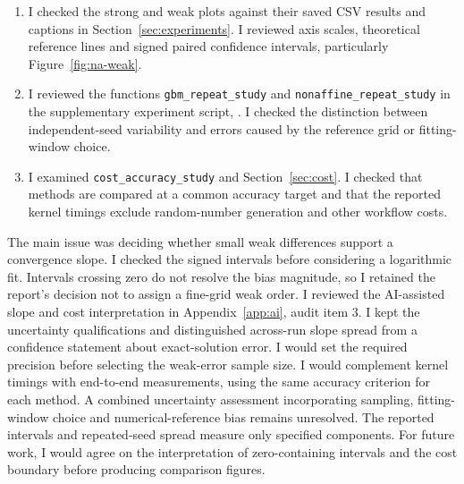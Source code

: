 \begin{enumerate}[leftmargin=2em,itemsep=2pt,topsep=2pt]
\item I checked the strong and weak plots against their saved CSV results and captions in Section~\ref{sec:experiments}. I reviewed axis scales, theoretical reference lines and signed paired confidence intervals, particularly Figure~\ref{fig:na-weak}.
\item I reviewed the functions \texttt{gbm\_repeat\_study} and \texttt{nonaffine\_repeat\_study} in the supplementary experiment script, . I checked the distinction between independent-seed variability and errors caused by the reference grid or fitting-window choice.
\item I examined \texttt{cost\_accuracy\_study} and Section~\ref{sec:cost}. I checked that methods are compared at a common accuracy target and that the reported kernel timings exclude random-number generation and other workflow costs.
\end{enumerate}
The main issue was deciding whether small weak differences support a convergence slope. I checked the signed intervals before considering a logarithmic fit. Intervals crossing zero do not resolve the bias magnitude, so I retained the report's decision not to assign a fine-grid weak order.
I reviewed the AI-assisted slope and cost interpretation in Appendix~\ref{app:ai}, audit item 3. I kept the uncertainty qualifications and distinguished across-run slope spread from a confidence statement about exact-solution error.
I would set the required precision before selecting the weak-error sample size. I would complement kernel timings with end-to-end measurements, using the same accuracy criterion for each method.
A combined uncertainty assessment incorporating sampling, fitting-window choice and numerical-reference bias remains unresolved. The reported intervals and repeated-seed spread measure only specified components.
For future work, I would agree on the interpretation of zero-containing intervals and the cost boundary before producing comparison figures.
\IndividualStatementEnd

